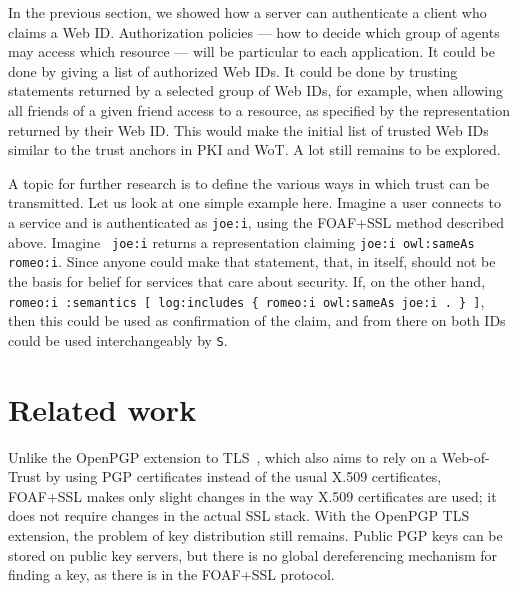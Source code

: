 \documentclass{llncs}
\begin{document}
In the previous section, we showed how a server can authenticate
a client who claims a Web ID.  Authorization policies --- how to decide
which group of agents may access which resource --- will be particular to
each application. It could be done by giving a list of authorized Web IDs.  It could
be done by trusting statements returned by a selected group of Web IDs,
for example, when allowing all friends of a given friend access to a
resource, as specified by the representation returned by their
Web ID. This would make the initial list of trusted Web IDs similar to the trust anchors in PKI and WoT.
A lot still remains to be explored.

A topic for further research is to define the various ways in which
trust can be transmitted. Let us look at one simple example
here. Imagine a user connects to a service and is authenticated as
{\tt joe:i}, using the FOAF+SSL method described above. Imagine {\tt
  joe:i} returns a representation claiming {\tt joe:i owl:sameAs
  romeo:i}. Since anyone could make that statement, that, in itself,
should not be the basis for belief for services that care about
security. If, on the other hand, {\tt romeo:i :semantics [
    log:includes \{ romeo:i owl:sameAs joe:i . \} ]}, then this could be
used as confirmation of the claim, and from there on both IDs could be used 
interchangeably by {\tt S}.

\section{Related work}
\label{sec:other}


Unlike the OpenPGP extension to TLS~\cite{rfc5081}, which also aims to
rely on a Web-of-Trust by using PGP certificates instead of the usual
X.509 certificates, FOAF+SSL makes only slight changes in the way
X.509 certificates are used; it does not require changes in the actual
SSL stack. With the OpenPGP TLS extension, the problem of key distribution 
still remains. Public PGP keys can be stored on public key servers, but there is no
global dereferencing mechanism for finding a key, as there is in the FOAF+SSL protocol.
\end{document}

